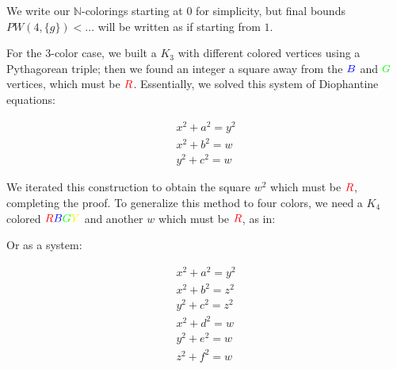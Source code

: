 \documentclass[a4paper]{amsproc}
\theoremstyle{plain}
\newcommand{\RR} {\color{red} R}
\newcommand{\BB} {\color{blue} B}
\newcommand{\GG} {\color{green} G}
\newcommand{\YY} {\color{yellow} Y}
\newcommand{\N} {\mathbb{N}}
\begin{document}
We write our $\N$-colorings starting at $0$ for simplicity, but final bounds $PW(4, \{g\}) < \ldots$ will be written as if starting from $1$.

For the 3-color case, we built a $K_3$ with different colored vertices using a Pythagorean triple;
then we found an integer a square away from the $\BB$ and $\GG$ vertices, which must be $\RR$.
Essentially, we solved this system of Diophantine equations:

$$
\begin{matrix}
x^2 + a^2 = y^2 \\
x^2 + b^2 = w \\
y^2 + c^2 = w
\end{matrix}
$$

We iterated this construction to obtain the square $w^2$ which must be $\RR$, completing the proof.
To generalize this method to four colors, we need a $K_4$ colored $\RR\BB\GG\YY$ and another $w$ which must be $\RR$, as in:

\pagebreak
\begin{figure}[Htb]
\end{figure}

Or as a system:

$$
\begin{matrix}
x^2 + a^2 = y^2 \\
x^2 + b^2 = z^2 \\
y^2 + c^2 = z^2 \\
x^2 + d^2 = w \\
y^2 + e^2 = w \\
z^2 + f^2 = w
\end{matrix}
$$
\end{document}
